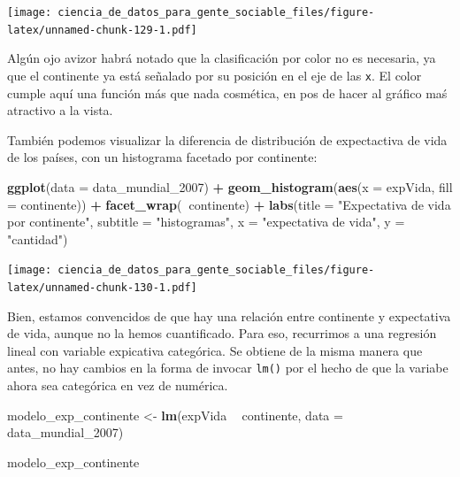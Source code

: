\documentclass[spanish,]{book}
\newenvironment{Shaded}{\begin{snugshade}}{\end{snugshade}}
\newcommand{\DataTypeTok}[1]{\textcolor[rgb]{0.13,0.29,0.53}{#1}}
\newcommand{\DecValTok}[1]{\textcolor[rgb]{0.00,0.00,0.81}{#1}}
\newcommand{\KeywordTok}[1]{\textcolor[rgb]{0.13,0.29,0.53}{\textbf{#1}}}
\newcommand{\NormalTok}[1]{#1}
\newcommand{\OperatorTok}[1]{\textcolor[rgb]{0.81,0.36,0.00}{\textbf{#1}}}
\newcommand{\StringTok}[1]{\textcolor[rgb]{0.31,0.60,0.02}{#1}}
\begin{document}
\texttt{[image: ciencia\_de\_datos\_para\_gente\_sociable\_files/figure-latex/unnamed-chunk-129-1.pdf]}

Algún ojo avizor habrá notado que la clasificación por color no es necesaria, ya que el continente ya está señalado por su posición en el eje de las \texttt{x}. El color cumple aquí una función más que nada cosmética, en pos de hacer al gráfico maś atractivo a la vista.

También podemos visualizar la diferencia de distribución de expectactiva de vida de los países, con un histograma facetado por continente:

\begin{Shaded}
\begin{Highlighting}[]
\KeywordTok{ggplot}\NormalTok{(}\DataTypeTok{data =}\NormalTok{ data_mundial_}\DecValTok{2007}\NormalTok{) }\OperatorTok{+}
\StringTok{    }\KeywordTok{geom_histogram}\NormalTok{(}\KeywordTok{aes}\NormalTok{(}\DataTypeTok{x =}\NormalTok{ expVida, }\DataTypeTok{fill =}\NormalTok{ continente)) }\OperatorTok{+}
\StringTok{    }\KeywordTok{facet_wrap}\NormalTok{(}\OperatorTok{~}\NormalTok{continente) }\OperatorTok{+}
\StringTok{    }\KeywordTok{labs}\NormalTok{(}\DataTypeTok{title =} \StringTok{"Expectativa de vida por continente"}\NormalTok{,}
         \DataTypeTok{subtitle =} \StringTok{"histogramas"}\NormalTok{,}
        \DataTypeTok{x =} \StringTok{"expectativa de vida"}\NormalTok{,}
        \DataTypeTok{y =} \StringTok{"cantidad"}\NormalTok{)}
\end{Highlighting}
\end{Shaded}

\texttt{[image: ciencia\_de\_datos\_para\_gente\_sociable\_files/figure-latex/unnamed-chunk-130-1.pdf]}

Bien, estamos convencidos de que hay una relación entre continente y expectativa de vida, aunque no la hemos cuantificado. Para eso, recurrimos a una regresión lineal con variable expicativa categórica. Se obtiene de la misma manera que antes, no hay cambios en la forma de invocar \texttt{lm()} por el hecho de que la variabe ahora sea categórica en vez de numérica.

\begin{Shaded}
\begin{Highlighting}[]
\NormalTok{modelo_exp_continente <-}\StringTok{ }\KeywordTok{lm}\NormalTok{(expVida }\OperatorTok{~}\StringTok{ }\NormalTok{continente, }\DataTypeTok{data =}\NormalTok{ data_mundial_}\DecValTok{2007}\NormalTok{)}


\NormalTok{modelo_exp_continente}
\end{Highlighting}
\end{Shaded}
\end{document}
